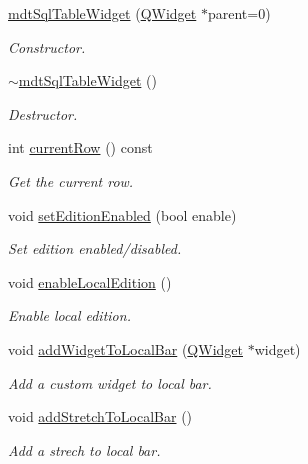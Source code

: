 \begin{DoxyCompactItemize}
\item 
\hyperlink{classmdt_sql_table_widget_a4cf2b0d69608e88d33996148f612e58d}{mdt\-Sql\-Table\-Widget} (\hyperlink{class_q_widget}{Q\-Widget} $\ast$parent=0)
\begin{DoxyCompactList}\small\item\em Constructor. \end{DoxyCompactList}\item 
\hyperlink{classmdt_sql_table_widget_ab5db8a20c64340bba4841a1b1c928d7f}{$\sim$mdt\-Sql\-Table\-Widget} ()
\begin{DoxyCompactList}\small\item\em Destructor. \end{DoxyCompactList}\item 
int \hyperlink{classmdt_sql_table_widget_a7612cf9cb10c69365b7ed820d71e6cb2}{current\-Row} () const 
\begin{DoxyCompactList}\small\item\em Get the current row. \end{DoxyCompactList}\item 
void \hyperlink{classmdt_sql_table_widget_af5ef66b8ebb45a698f99ad455208f3c8}{set\-Edition\-Enabled} (bool enable)
\begin{DoxyCompactList}\small\item\em Set edition enabled/disabled. \end{DoxyCompactList}\item 
void \hyperlink{classmdt_sql_table_widget_a39422fb9522ee73513f13d8bcb91a143}{enable\-Local\-Edition} ()
\begin{DoxyCompactList}\small\item\em Enable local edition. \end{DoxyCompactList}\item 
void \hyperlink{classmdt_sql_table_widget_a9c0ae7b87d1840f2fdcee6de763fe31a}{add\-Widget\-To\-Local\-Bar} (\hyperlink{class_q_widget}{Q\-Widget} $\ast$widget)
\begin{DoxyCompactList}\small\item\em Add a custom widget to local bar. \end{DoxyCompactList}\item 
void \hyperlink{classmdt_sql_table_widget_a6cf9f08b98dd3df16d36c29db7175633}{add\-Stretch\-To\-Local\-Bar} ()
\begin{DoxyCompactList}\small\item\em Add a strech to local bar. \end{DoxyCompactList}\item 

\end{DoxyCompactItemize}
